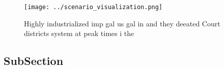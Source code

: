 \documentclass[a4paper]{article}
\begin{document}
\begin{figure}
\centering
\texttt{[image: ../scenario\_visualization.png]}
\caption{Highly industrialized imp gal us gal in and they deeated Court districts system at peak times i the
}
\end{figure}
 
\subsection{SubSection}
\end{document}
